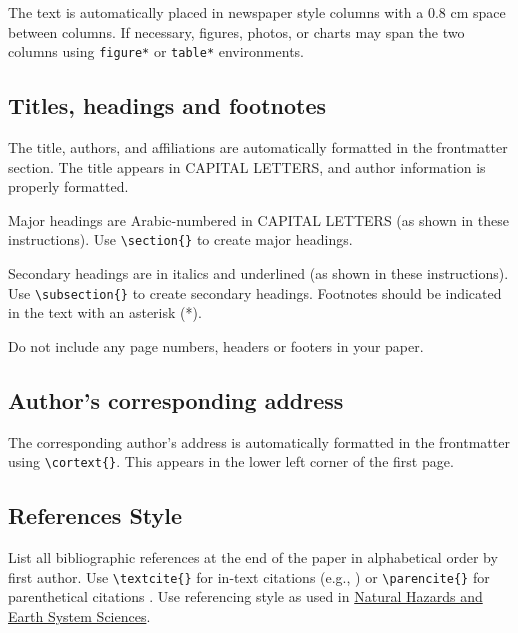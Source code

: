 \documentclass{issw}
\begin{document}
The text is automatically placed in newspaper style columns with a 0.8 cm space between columns. If necessary, figures, photos, or charts may span the two columns using \verb|figure*| or \verb|table*| environments.

\subsection{Titles, headings and footnotes}
The title, authors, and affiliations are automatically formatted in the frontmatter section. The title appears in CAPITAL LETTERS, and author information is properly formatted.

Major headings are Arabic-numbered in CAPITAL LETTERS (as shown in these instructions). Use \verb|\section{}| to create major headings.

Secondary headings are in italics and underlined (as shown in these instructions). Use \verb|\subsection{}| to create secondary headings. Footnotes should be indicated in the text with an asterisk (*).

Do not include any page numbers, headers or footers in your paper.

\subsection{Author's corresponding address}
The corresponding author's address is automatically formatted in the frontmatter using \verb|\cortext{}|. This appears in the lower left corner of the first page.

\subsection{References Style}
List all bibliographic references at the end of the paper in alphabetical order by first author. Use \verb|\textcite{}| for in-text citations (e.g., \textcite{McClung2006}) or \verb|\parencite{}| for parenthetical citations \parencite{Fischer2022}. Use referencing style as used in \href{https://www.natural-hazards-and-earth-system-sciences.net/submission.html}{Natural Hazards and Earth System Sciences}.

\nocite{hortonVisualizationDesign2020}
\end{document}
